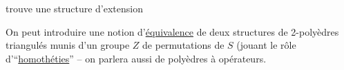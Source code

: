 trouve une structure d'extension

On peut introduire une notion d'\uline{équivalence} de deux structures de 2-polyèdres  triangulés  munis d'un groupe $Z$  de permutations de $S$ (jouant le rôle d'``\uline{homothéties}'' -- on parlera aussi de  polyèdres à opérateurs.
